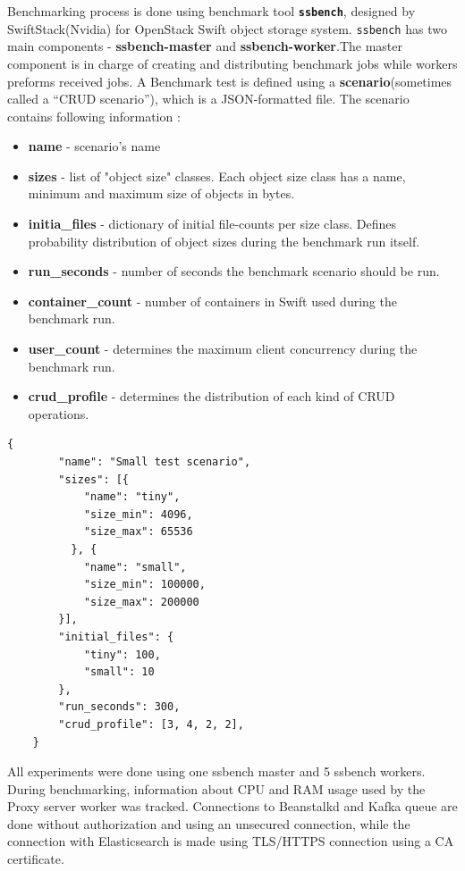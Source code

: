     Benchmarking process is done using benchmark tool \textbf{\texttt{ssbench}}, designed by SwiftStack(Nvidia) for OpenStack Swift object storage system. \texttt{ssbench} has two main components - \textbf{ssbench-master} and \textbf{ssbench-worker}.The master component is in charge of creating and distributing benchmark jobs while workers preforms received jobs. A Benchmark test is defined using a \textbf{scenario}(sometimes called a “CRUD scenario”), which is a JSON-formatted file. The scenario contains following information \cite{swiftSsbench}:
    \begin{itemize}
        \item \textbf{name} - scenario's name
        \item \textbf{sizes} - list of "object size" classes. Each object size class has a name, minimum and maximum size of objects in bytes.
        \item \textbf{initia\_files} - dictionary of initial file-counts per size class. Defines probability distribution of object sizes during the benchmark run itself.
        \item \textbf{run\_seconds} - number of seconds the benchmark scenario should be run.
        \item \textbf{container\_count} - number of containers in Swift used during the benchmark run.
        \item \textbf{user\_count} - determines the maximum client concurrency during the benchmark run.
        \item \textbf{crud\_profile} - determines the distribution of each kind of CRUD operations.
    \end{itemize}

    \begin{lstlisting}[style=jsonStyle, caption=Example of ssbench scenario.]
    {
        "name": "Small test scenario",
        "sizes": [{
            "name": "tiny",
            "size_min": 4096,
            "size_max": 65536
          }, {
            "name": "small",
            "size_min": 100000,
            "size_max": 200000
        }],
        "initial_files": {
            "tiny": 100,
            "small": 10
        },
        "run_seconds": 300,
        "crud_profile": [3, 4, 2, 2],
    }
    \end{lstlisting}

    All experiments were done using one ssbench master and 5 ssbench workers. During benchmarking, information about CPU and RAM usage used by the Proxy server worker was tracked. Connections to Beanstalkd and Kafka queue are done without authorization and using an unsecured connection, while the connection with Elasticsearch is made using TLS/HTTPS connection using a CA certificate.

